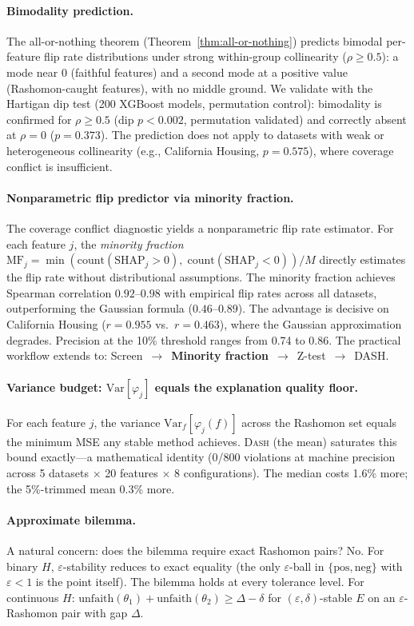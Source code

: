 \documentclass{jmlr}
\newcommand{\Var}{\mathrm{Var}}
\newcommand{\DASH}{\textsc{Dash}}
\begin{document}
\paragraph{Bimodality prediction.}
The all-or-nothing theorem (Theorem~\ref{thm:all-or-nothing}) predicts bimodal per-feature flip rate distributions under strong within-group collinearity ($\rho \geq 0.5$): a mode near $0$ (faithful features) and a second mode at a positive value (Rashomon-caught features), with no middle ground.
We validate with the Hartigan dip test (200 XGBoost models, permutation control): bimodality is confirmed for $\rho \geq 0.5$ (dip $p < 0.002$, permutation validated) and correctly absent at $\rho = 0$ ($p = 0.373$). The prediction does not apply to datasets with weak or heterogeneous collinearity (e.g., California Housing, $p = 0.575$), where coverage conflict is insufficient.

\paragraph{Nonparametric flip predictor via minority fraction.}
The coverage conflict diagnostic yields a nonparametric flip rate estimator.
For each feature $j$, the \emph{minority fraction} $\text{MF}_j = \min(\text{count}(\text{SHAP}_j > 0),\; \text{count}(\text{SHAP}_j < 0))/M$ directly estimates the flip rate without distributional assumptions.
The minority fraction achieves Spearman correlation $0.92$--$0.98$ with empirical flip rates across all datasets, outperforming the Gaussian formula ($0.46$--$0.89$).
The advantage is decisive on California Housing ($r = 0.955$ vs.\ $r = 0.463$), where the Gaussian approximation degrades.
Precision at the 10\% threshold ranges from 0.74 to 0.86.
The practical workflow extends to: Screen~$\to$~\textbf{Minority fraction}~$\to$~Z-test~$\to$~DASH.

\paragraph{Variance budget: $\Var[\varphi_j]$ equals the explanation quality floor.}
For each feature $j$, the variance $\Var_f[\varphi_j(f)]$ across the Rashomon set equals the minimum MSE any stable method achieves. \DASH{} (the mean) saturates this bound exactly---a mathematical identity (0/800 violations at machine precision across 5 datasets $\times$ 20 features $\times$ 8 configurations). The median costs 1.6\% more; the 5\%-trimmed mean 0.3\% more.

\paragraph{Approximate bilemma.}
A natural concern: does the bilemma require exact Rashomon pairs? No. For binary $H$, $\varepsilon$-stability reduces to exact equality (the only $\varepsilon$-ball in $\{\text{pos}, \text{neg}\}$ with $\varepsilon < 1$ is the point itself). The bilemma holds at every tolerance level. For continuous $H$: $\text{unfaith}(\theta_1) + \text{unfaith}(\theta_2) \geq \Delta - \delta$ for $(\varepsilon, \delta)$-stable $E$ on an $\varepsilon$-Rashomon pair with gap $\Delta$.
\end{document}
